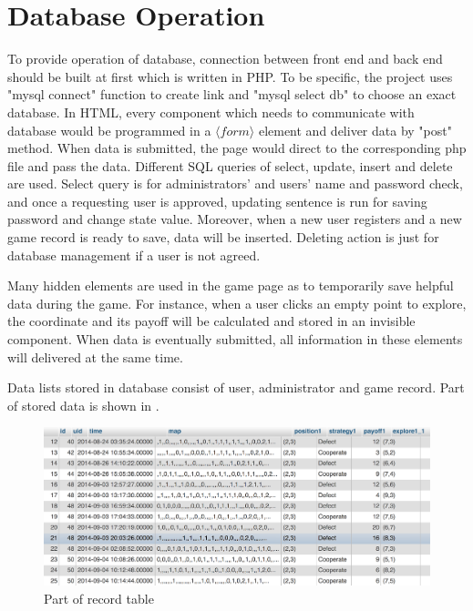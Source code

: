 \section{Database Operation}
To provide operation of database, connection between front end and back end should be built at first which is written in PHP. To be specific, the project uses "mysql connect" function to create link and "mysql select db" to choose an exact database. In HTML, every component which needs to communicate with database would be programmed in a $\langle form \rangle$ element and deliver data by "post" method. When data is submitted, the page would direct to the corresponding php file and pass the data. Different SQL queries of select, update, insert and delete are used. Select query is for administrators' and users' name and password check, and once a requesting user is approved, updating sentence is run for saving password and change state value. Moreover, when a new user registers and a new game record is ready to save, data will be inserted. Deleting action is just for database management if a user is not agreed.

Many hidden elements are used in the game page as to temporarily save helpful data during the game. For instance, when a user clicks an empty point to explore, the coordinate and its payoff will be calculated and stored in an invisible component. When data is eventually submitted, all information in these elements will delivered at the same time.

Data lists stored in database consist of user, administrator and game record. Part of stored data is shown in .
\begin{figure}[!htb]
  \centering
  \includegraphics[width=14cm]{recordtable.png}
  \caption{Part of record table}
  \label{Figure:record}
\end{figure}
